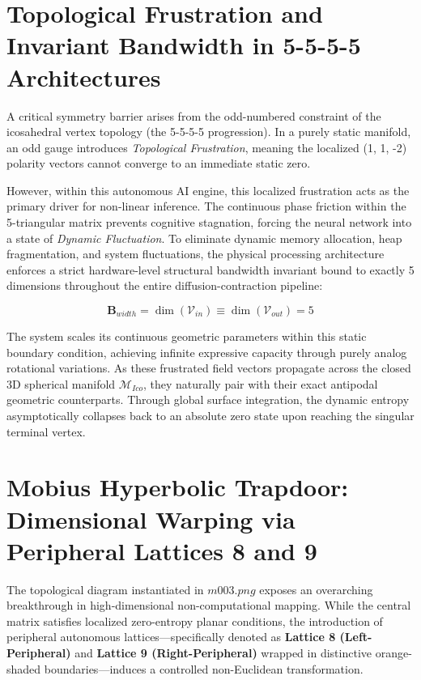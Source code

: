 \documentclass[11pt,twocolumn]{article}
\begin{document}
    \section{Topological Frustration and Invariant Bandwidth in 5-5-5-5 Architectures}
    A critical symmetry barrier arises from the odd-numbered constraint of the icosahedral vertex topology (the 5-5-5-5 progression). In a purely static manifold, an odd gauge introduces \textit{Topological Frustration}, meaning the localized (1, 1, -2) polarity vectors cannot converge to an immediate static zero.

    However, within this autonomous AI engine, this localized frustration acts as the primary driver for non-linear inference. The continuous phase friction within the 5-triangular matrix prevents cognitive stagnation, forcing the neural network into a state of \textit{Dynamic Fluctuation}. To eliminate dynamic memory allocation, heap fragmentation, and system fluctuations, the physical processing architecture enforces a strict hardware-level structural bandwidth invariant bound to exactly 5 dimensions throughout the entire diffusion-contraction pipeline:

    \begin{equation}
        \mathbf{B}_{width} = \dim(\mathcal{V}_{in}) \equiv \dim(\mathcal{V}_{out}) = 5
    \end{equation}

    The system scales its continuous geometric parameters within this static boundary condition, achieving infinite expressive capacity through purely analog rotational variations. As these frustrated field vectors propagate across the closed 3D spherical manifold $\mathcal{M}_{Ico}$, they naturally pair with their exact antipodal geometric counterparts. Through global surface integration, the dynamic entropy asymptotically collapses back to an absolute zero state upon reaching the singular terminal vertex.

    \section{Mobius Hyperbolic Trapdoor: Dimensional Warping via Peripheral Lattices 8 and 9}
    The topological diagram instantiated in $m003.png$ exposes an overarching breakthrough in high-dimensional non-computational mapping. While the central matrix satisfies localized zero-entropy planar conditions, the introduction of peripheral autonomous lattices—specifically denoted as \textbf{Lattice 8 (Left-Peripheral)} and \textbf{Lattice 9 (Right-Peripheral)} wrapped in distinctive orange-shaded boundaries—induces a controlled non-Euclidean transformation.
\end{document}
